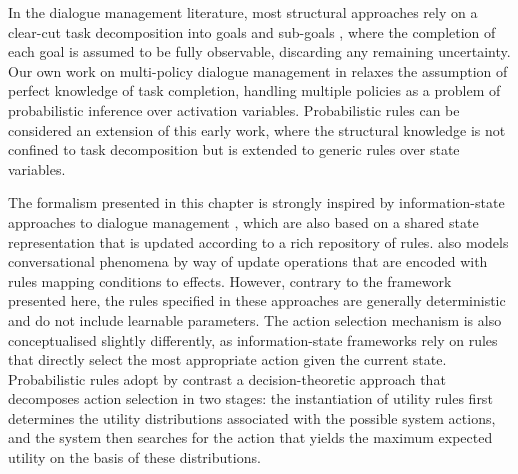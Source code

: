 In the dialogue management literature, most structural approaches rely on a clear-cut task decomposition into goals and sub-goals \citep{Allen:2000:AGD:973935.973937,Steedman-Petrick:07,Bohus:2009}, where the completion of each goal is assumed to be fully observable, discarding any remaining uncertainty.  Our own work on multi-policy dialogue management in \cite{multipolicy-sigdial2011} relaxes the assumption of perfect knowledge of task completion, handling multiple policies as a problem of probabilistic inference over activation variables.  Probabilistic rules can be considered an extension of this early work, where the structural knowledge is not confined to task decomposition but is extended to generic rules over state variables.  

The formalism presented in this chapter is strongly inspired by information-state approaches to dialogue management \citep{Larsson:2000,Bos2003}, which are also based on a shared state representation that is updated according to a rich repository of rules.  \cite{Ginzburg2012} also models conversational phenomena by way of update operations that are encoded with rules mapping conditions to effects. However, contrary to the framework presented here, the rules specified in these approaches are generally deterministic and do not include learnable parameters. The action selection mechanism is also conceptualised slightly differently, as information-state frameworks rely on rules that directly select the most appropriate action given the current state. Probabilistic rules adopt by contrast a decision-theoretic approach that decomposes action selection in two stages: the instantiation of utility rules first determines the utility distributions associated with the possible system actions, and the system then searches for the action that yields the maximum expected utility on the basis of these distributions.  

